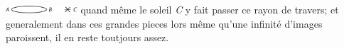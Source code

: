                 \includegraphics[width=0.2\textwidth]{images/37_2_122r}
                               quand même le soleil \textit{C} y fait passer ce rayon de travers; et generalement dans ces grandes pieces lors même qu'une infinit\'{e} d'images paroissent, il en reste toutjours assez.\pend 